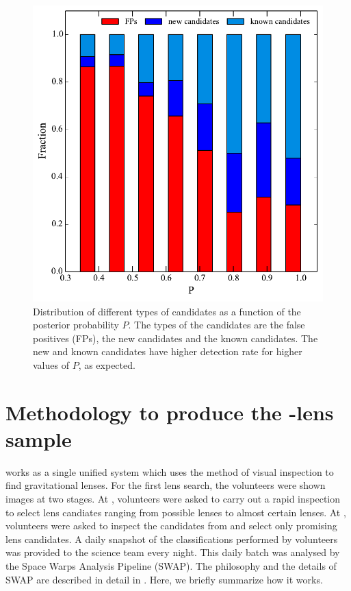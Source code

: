 \documentclass[useAMS,usenatbib,a4paper]{mn2e}
\begin{document}
\begin{figure}
\begin{center}
\includegraphics[scale=0.6]{cand_fp_P_frac.pdf}
\caption{ \label{fig:stackP}
Distribution of different types of candidates as a function of the
posterior probability $P$. The types of the candidates are the false
positives (FPs), the new candidates and the known candidates. The new
and known candidates have higher detection rate for higher values of $P$,
as expected.}
\end{center}
\end{figure}


\section{Methodology to produce the \sw-\cfhtls lens sample}
\label{sec:swap}

\sw works as a single unified system which uses the method of visual
inspection to find gravitational lenses. For the first \sw lens search,
the volunteers were shown images at two stages. At \StageOne, volunteers
were asked to carry out a rapid inspection to select lens candiates
ranging from possible lenses to almost certain lenses. At \StageTwo,
volunteers were asked to inspect the candidates from \StageOne and select
only promising lens candidates. A daily snapshot of the classifications
performed by volunteers was provided to the science team every night.
This daily batch was analysed by the Space Warps Analysis Pipeline
(SWAP). The philosophy and the details of SWAP are described in detail
in \PaperOne. Here, we briefly summarize how it works.
\end{document}
